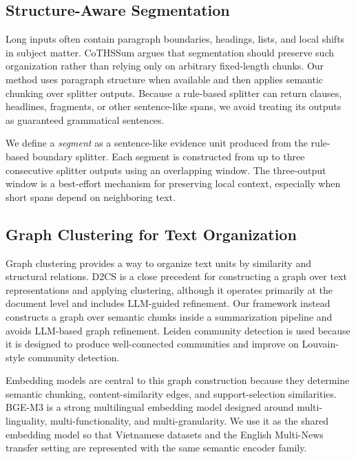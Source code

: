 \documentclass[11pt]{article}
\begin{document}
\subsection{Structure-Aware Segmentation}

Long inputs often contain paragraph boundaries, headings, lists, and local shifts in subject matter. CoTHSSum \citep{chen-2025-cothssum} argues that segmentation should preserve such organization rather than relying only on arbitrary fixed-length chunks. Our method uses paragraph structure when available and then applies semantic chunking over splitter outputs. Because a rule-based splitter can return clauses, headlines, fragments, or other sentence-like spans, we avoid treating its outputs as guaranteed grammatical sentences.

We define a \textit{segment} as a sentence-like evidence unit produced from the rule-based boundary splitter. Each segment is constructed from up to three consecutive splitter outputs using an overlapping window. The three-output window is a best-effort mechanism for preserving local context, especially when short spans depend on neighboring text.

\subsection{Graph Clustering for Text Organization}

Graph clustering provides a way to organize text units by similarity and structural relations. D2CS \citep{ashkenazi-2025-d2cs} is a close precedent for constructing a graph over text representations and applying clustering, although it operates primarily at the document level and includes LLM-guided refinement. Our framework instead constructs a graph over semantic chunks inside a summarization pipeline and avoids LLM-based graph refinement. Leiden community detection \citep{traag-2019-leiden} is used because it is designed to produce well-connected communities and improve on Louvain-style community detection.

Embedding models are central to this graph construction because they determine semantic chunking, content-similarity edges, and support-selection similarities. BGE-M3 \citep{bge_m3} is a strong multilingual embedding model designed around multi-linguality, multi-functionality, and multi-granularity. We use it as the shared embedding model so that Vietnamese datasets and the English Multi-News transfer setting are represented with the same semantic encoder family.
\end{document}
